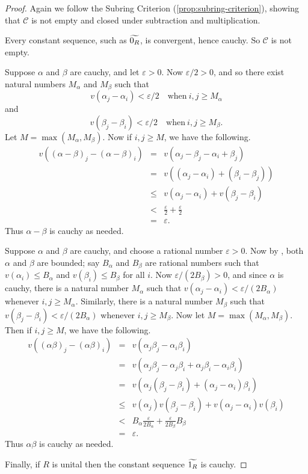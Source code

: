 \begin{proof}
Again we follow the Subring Criterion (\ref{prop:subring-criterion}), showing that \(\mathcal{C}\) is not empty and closed under subtraction and multiplication.
\begin{inlineproplist}
\item Every constant sequence, such as \(\widetilde{0_R}\), is convergent, hence cauchy.
So \(\mathcal{C}\) is not empty.
\item Suppose \(\alpha\) and \(\beta\) are cauchy, and let \(\varepsilon > 0\).
Now \(\varepsilon/2 > 0\), and so there exist natural numbers \(M_\alpha\) and \(M_\beta\) such that \[ v(\alpha_j - \alpha_i) < \varepsilon/2 \quad \mathrm{when}\ i,j \geq M_\alpha \] and \[ v(\beta_j - \beta_i) < \varepsilon/2 \quad \mathrm{when}\ i,j \geq M_\beta. \]
Let \(M = \max(M_\alpha, M_\beta)\).
Now if \(i,j \geq M\), we have the following.
\begin{eqnarray*}
v\left( (\alpha - \beta)_j - (\alpha - \beta)_i \right)
 & = & v(\alpha_j - \beta_j - \alpha_i + \beta_j) \\
 & = & v\left( (\alpha_j - \alpha_i) + (\beta_i - \beta_j) \right) \\
 & \leq & v(\alpha_j - \alpha_i) + v(\beta_j - \beta_i) \\
 & < & \frac{\varepsilon}{2} + \frac{\varepsilon}{2} \\
 & = & \varepsilon.
\end{eqnarray*}
Thus \(\alpha - \beta\) is cauchy as needed.
\item Suppose \(\alpha\) and \(\beta\) are cauchy, and choose a rational number \(\varepsilon > 0\).
Now by , both \(\alpha\) and \(\beta\) are bounded; say \(B_\alpha\) and \(B_\beta\) are rational numbers such that \(v(\alpha_i) \leq B_\alpha\) and \(v(\beta_i) \leq B_\beta\) for all \(i\).
Now \(\varepsilon/(2B_\beta) > 0\), and since \(\alpha\) is cauchy, there is a natural number \(M_\alpha\) such that \(v(\alpha_j - \alpha_i) < \varepsilon/(2B_\alpha)\) whenever \(i,j \geq M_\alpha\).
Similarly, there is a natural number \(M_\beta\) such that \(v(\beta_j - \beta_i) < \varepsilon/(2B_\alpha)\) whenever \(i,j \geq M_\beta\).
Now let \(M = \max(M_\alpha,M_\beta)\).
Then if \(i,j \geq M\), we have the following.
\begin{eqnarray*}
v\left((\alpha\beta)_j - (\alpha\beta)_i\right)
 & = & v(\alpha_j\beta_j - \alpha_i\beta_i) \\
 & = & v(\alpha_j\beta_j - \alpha_j\beta_i + \alpha_j\beta_i - \alpha_i\beta_i) \\
 & = & v\left( \alpha_j(\beta_j - \beta_i) + (\alpha_j - \alpha_i)\beta_i \right) \\
 & \leq & v(\alpha_j)v(\beta_j - \beta_i) + v(\alpha_j - \alpha_i)v(\beta_i) \\
 & < & B_\alpha \frac{\varepsilon}{2B_\alpha} + \frac{\varepsilon}{2B_\beta} B_\beta \\
 & = & \varepsilon.
\end{eqnarray*}
Thus \(\alpha\beta\) is cauchy as needed.
\end{inlineproplist}
Finally, if \(R\) is unital then the constant sequence \(\widetilde{1_R}\) is cauchy.
\end{proof}

